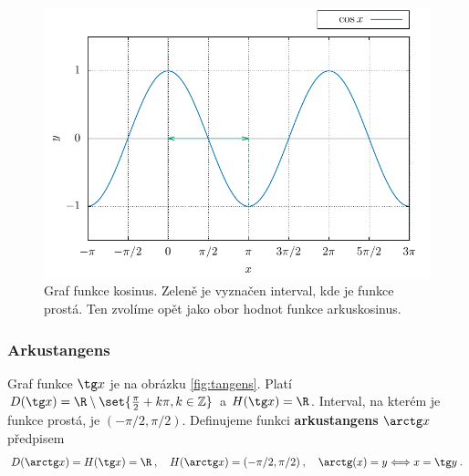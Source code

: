 \begin{figure}[H]
    \centering
    \includegraphics{Gnuplot/cv1/Figures/cosinusgraf.pdf}
    \caption{Graf funkce kosinus. Zeleně je vyznačen interval, kde je funkce prostá. Ten zvolíme opět jako obor hodnot funkce arkuskosinus.}
    \label{fig:kosinus}
\end{figure}


\subsubsection*{Arkustangens}

Graf funkce $\tg x$ je na obrázku \ref{fig:tangens}. Platí $D(\tg x) = \R \setminus \set{\frac{\pi}{2}+ k \pi, k \in \mathbb{Z}}$ a $H(\tg x) = \R$. Interval, na kterém je funkce prostá, je $(-\pi/2, \pi/2)$. Definujeme funkci \textbf{arkustangens} $\arctg x$ předpisem \begin{align}
    D(\arctg x) = H(\tg x) = \R \:, \quad H(\arctg x) = (-\pi/2, \pi/2) \:, \quad \arctg(x) = y \Longleftrightarrow x = \tg y \:.
\end{align}

